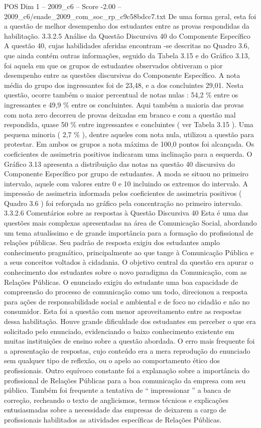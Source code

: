 \begin{textsample}{POS Dim 1 – 2009\_c6 – Score -2.00 – 2009\_c6/enade\_2009\_com\_soc\_rp\_c9c58bdcc7.txt}
De uma forma geral, esta foi a questão de melhor desempenho dos estudantes entre as provas respondidas da habilitação. 3.3.2.5 Análise da Questão Discursiva 40 do Componente Específico A questão 40, cujas habilidades aferidas encontram -se descritas no Quadro 3.6, que ainda contém outras informações, seguido da Tabela 3.15 e do Gráfico 3.13, foi aquela em que os grupos de estudantes observados obtiveram o pior desempenho entre as questões discursivas do Componente Específico.
A nota média do grupo dos ingressantes foi de 23,48, e a dos concluintes 29,01.
Nesta questão, ocorre também o maior percentual de notas nulas : 54,2 \% entre os ingressantes e 49,9 \% entre os concluintes.
Aqui também a maioria das provas com nota zero decorreu de provas deixadas em branco e com a questão mal respondida, quase 50 \% entre ingressantes e concluintes ( ver Tabela 3.15 ).
Uma pequena minoria ( 2,7 \% ), dentre aqueles com nota nula, utilizou a questão para protestar.
Em ambos os grupos a nota máxima de 100,0 pontos foi alcançada.
Os coeficientes de assimetria positivos indicaram uma inclinação para a esquerda.
O Gráfico 3.13 apresenta a distribuição das notas na questão 40 discursiva do Componente Específico por grupo de estudantes.
A moda se situou no primeiro intervalo, aquele com valores entre 0 e 10 incluindo os extremos do intervalo.
A impressão de assimetria informada pelos coeficientes de assimetria positivos ( Quadro 3.6 ) foi reforçada no gráfico pela concentração no primeiro intervalo. 3.3.2.6 Comentários sobre as respostas à Questão Discursiva 40 Esta é uma das questões mais complexas apresentadas na área de Comunicação Social, abordando um tema atualíssimo e de grande importância para a formação do profissional de relações públicas.
Seu padrão de resposta exigiu dos estudantes amplo conhecimento pragmático, principalmente ao que tange à Comunicação Pública e a seus conceitos voltados à cidadania.
O objetivo central da questão era apurar o conhecimento dos estudantes sobre o novo paradigma da Comunicação, com as Relações Públicas.
O enunciado exigiu do estudante uma boa capacidade de compreensão do processo de comunicação como um todo, direcionou a resposta para ações de responsabilidade social e ambiental e de foco no cidadão e não no consumidor.
Esta foi a questão com menor aproveitamento entre as respostas dessa habilitação.
Houve grande dificuldade dos estudantes em perceber o que era solicitado pelo enunciado, evidenciando o baixo conhecimento existente em muitas instituições de ensino sobre a questão abordada.
O erro mais frequente foi a apresentação de respostas, cujo conteúdo era a mera reprodução do enunciado sem qualquer tipo de reflexão, ou o apelo ao comportamento ético dos profissionais.
Outro equívoco constante foi a explanação sobre a importância do profissional de Relações Públicas para a boa comunicação da empresa com seu público.
Também foi frequente a tentativa de “ impressionar ” a banca de correção, recheando o texto de anglicismos, termos técnicos e explicações entusiasmadas sobre a necessidade das empresas de deixarem a cargo de profissionais habilitados as atividades específicas de Relações Públicas.

\end{textsample}
